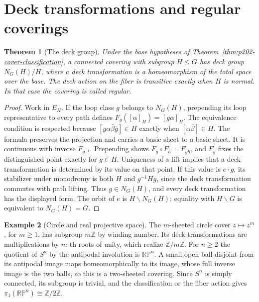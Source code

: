 \documentclass[11pt,oneside,openany]{book}
\theoremstyle{plain}
\newtheorem{theorem}{Theorem}[chapter]
\theoremstyle{definition}
\newtheorem{example}[theorem]{Example}
\theoremstyle{remark}
\begin{document}
\section{Deck transformations and regular coverings}\label{p202:T08}

\begin{theorem}[The deck group]
\label{thm:p202-deck-group}
Under the base hypotheses of
Theorem~\ref{thm:p202-cover-classification}, a connected
covering with subgroup \(H\le G\) has deck group
\(N_G(H)/H\), where a deck transformation is a
homeomorphism of the total space over the base.
The deck action on the fiber is transitive exactly when
\(H\) is normal. In that case the covering is called
regular.
\end{theorem}

\begin{proof}
Work in \(E_H\). If the loop class \(g\) belongs to
\(N_G(H)\), prepending its loop representative to every
path defines \(F_g([\alpha]_H)=[g\alpha]_H\). The equivalence
condition is respected because
\([g\alpha\bar\beta\bar g]\in H\) exactly when
\([\alpha\bar\beta]\in H\). The formula preserves the
projection and carries a basic sheet to a basic sheet.
It is continuous with inverse \(F_{g^{-1}}\). Prepending
shows \(F_g\circ F_h=F_{gh}\), and \(F_g\) fixes the
distinguished point exactly for \(g\in H\).
Uniqueness of a lift implies that a deck transformation is
determined by its value on that point. If this value is
\(e\cdot g\), its stabilizer under monodromy is both \(H\)
and \(g^{-1}Hg\), since the deck transformation commutes with
path lifting. Thus \(g\in N_G(H)\), and every deck
transformation has the displayed form. The orbit of \(e\)
is \(H\backslash N_G(H)\); equality with \(H\backslash G\)
is equivalent to \(N_G(H)=G\).
\end{proof}

\begin{example}[Circle and real projective space]
The \(m\)-sheeted circle cover \(z\mapsto z^m\), for \(m\ge1\),
has subgroup \(m\mathbb Z\) by winding number. Its deck
transformations are multiplications by \(m\)-th roots of
unity, which realize \(\mathbb Z/m\mathbb Z\).
For \(n\ge2\) the quotient of \(S^n\) by the antipodal
involution is \(\mathbb{RP}^n\). A small open ball disjoint
from its antipodal image maps homeomorphically to its image,
whose full inverse image is the two balls, so this is a
two-sheeted covering. Since \(S^n\) is simply connected, its
subgroup is trivial, and the classification or the fiber
action gives \(\pi_1(\mathbb{RP}^n)\cong\mathbb Z/2\mathbb Z\).
\end{example}
\end{document}

